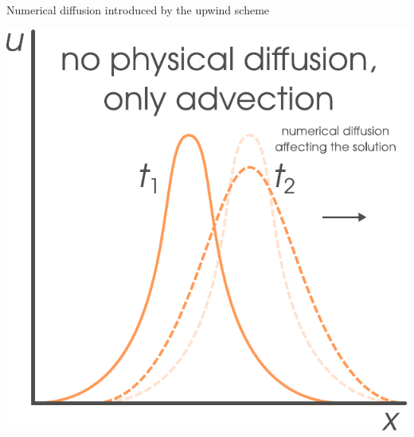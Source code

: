 \begin{frame}{Numerical diffusion introduced by the upwind scheme}
\rcol
\begin{center}
\includegraphics[height=0.6\textheight]{figures/reactive-transport//numerical-diffusion-illustration-2}
\par\end{center}

\ecol
\end{frame}
%
%
